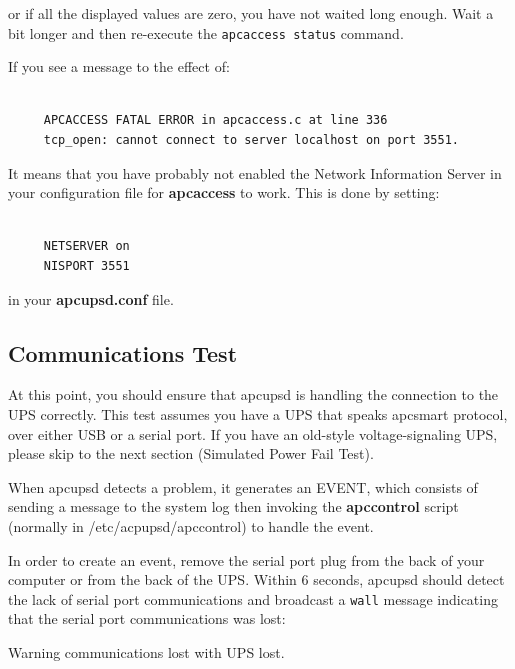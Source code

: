 {{or if all the displayed values are zero, you have not waited long enough. Wait
a bit longer and then re-execute the {\tt apcaccess status} command.  

If you see a message to the effect of: 

\footnotesize
\begin{verbatim}
     
     APCACCESS FATAL ERROR in apcaccess.c at line 336
     tcp_open: cannot connect to server localhost on port 3551.
\end{verbatim}
\normalsize

It means that you have probably not enabled the Network Information Server in
your configuration file for {\bf apcaccess} to work. This is done by setting: 

\footnotesize
\begin{verbatim}
     
     NETSERVER on
     NISPORT 3551
\end{verbatim}
\normalsize

in your {\bf apcupsd.conf} file. 

\label{Communications-Test}

\subsection*{Communications Test}

\label{index-Testing_002c-Communications-91}
\label{index-Communications-Testing-92}
At this point, you should ensure that apcupsd is handling the connection to
the UPS correctly. This test assumes you have a UPS that speaks apcsmart
protocol, over either USB or a serial port.  If you have an old-style
voltage-signaling UPS, please skip to the next section (Simulated Power Fail
Test).  

When apcupsd detects a problem, it generates an EVENT, which consists of
sending a message to the system log then invoking the {\bf apccontrol} script
(normally in /etc/acpupsd/apccontrol) to handle the event.  

In order to create an event, remove the serial port plug from the back of your
computer or from the back of the UPS. Within 6 seconds, apcupsd should detect
the lack of serial port communications and broadcast a {\tt wall} message
indicating that the serial port communications was lost:  

Warning communications lost with UPS lost.  

}}
